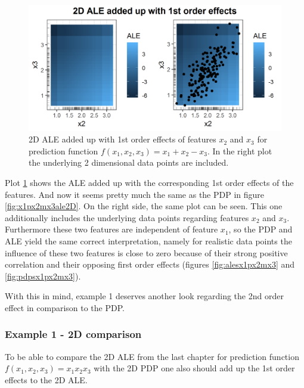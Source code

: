 \documentclass[]{krantz}
\begin{document}
\begin{figure}
\includegraphics[width=1\linewidth]{images/ale_1_2d_ale_plus_x1_plus_x2_minus_x3_150_0_2_0p5} \caption{2D ALE added up with 1st order effects of features
\(x_2\) and \(x_3\) for prediction function
\(f(x_1, x_2, x_3) = x_1 + x_2 - x_3\). In the right plot the underlying
2 dimensional data points are included.}\label{fig:ale2DaddedUp}
\end{figure}






Plot \ref{fig:ale2DaddedUp} shows the ALE added up with the
corresponding 1st order effects of the features. And now it seems pretty
much the same as the PDP in figure \ref{fig:x1px2mx3ale2D}. On the right
side, the same plot can be seen. This one additionally includes the
underlying data points regarding features \(x_2\) and \(x_3\).
Furthermore these two features are independent of feature \(x_1\), so
the PDP and ALE yield the same correct interpretation, namely for
realistic data points the influence of these two features is close to
zero because of their strong positive correlation and their opposing
first order effects (figures \ref{fig:alesx1px2mx3} and
\ref{fig:pdpsx1px2mx3}).

With this in mind, example 1 deserves another look regarding the 2nd
order effect in comparison to the PDP.

\subsubsection{Example 1 - 2D
comparison}\label{example-1---2d-comparison}

To be able to compare the 2D ALE from the last chapter for prediction
function \(f(x_1, x_2, x_3) = x_1 x_2 x_3\) with the 2D PDP one also
should add up the 1st order effects to the 2D ALE.
\end{document}
